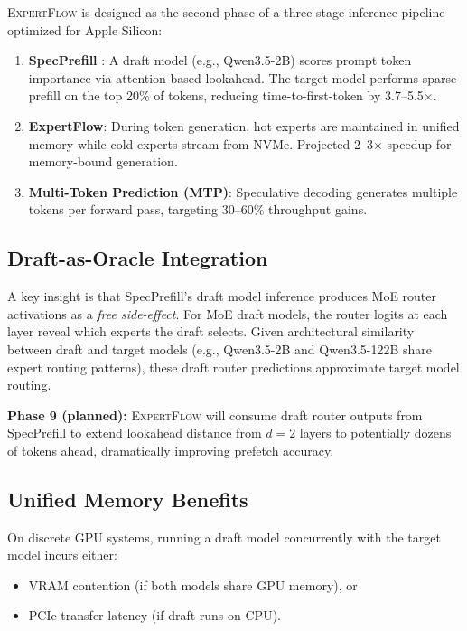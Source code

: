 \documentclass[11pt]{article}
\begin{document}
\textsc{ExpertFlow} is designed as the second phase of a three-stage inference pipeline optimized for Apple Silicon:

\begin{enumerate}
    \item \textbf{SpecPrefill} \cite{specprefill2026}: A draft model (e.g., Qwen3.5-2B) scores prompt token importance via attention-based lookahead. The target model performs sparse prefill on the top 20\% of tokens, reducing time-to-first-token by 3.7--5.5$\times$.

    \item \textbf{ExpertFlow}: During token generation, hot experts are maintained in unified memory while cold experts stream from NVMe. Projected 2--3$\times$ speedup for memory-bound generation.

    \item \textbf{Multi-Token Prediction (MTP)}: Speculative decoding generates multiple tokens per forward pass, targeting 30--60\% throughput gains.
\end{enumerate}

\subsection{Draft-as-Oracle Integration}

A key insight is that SpecPrefill's draft model inference produces MoE router activations as a \textit{free side-effect}. For MoE draft models, the router logits at each layer reveal which experts the draft selects. Given architectural similarity between draft and target models (e.g., Qwen3.5-2B and Qwen3.5-122B share expert routing patterns), these draft router predictions approximate target model routing.

\textbf{Phase 9 (planned):} \textsc{ExpertFlow} will consume draft router outputs from SpecPrefill to extend lookahead distance from $d=2$ layers to potentially dozens of tokens ahead, dramatically improving prefetch accuracy.

\subsection{Unified Memory Benefits}

On discrete GPU systems, running a draft model concurrently with the target model incurs either:
\begin{itemize}
    \item VRAM contention (if both models share GPU memory), or
    \item PCIe transfer latency (if draft runs on CPU).
\end{itemize}
\end{document}
